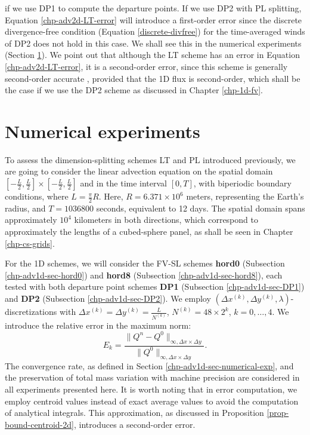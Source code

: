 if we use DP1 to compute the departure points.
If we use DP2 with PL splitting, Equation \eqref{chp-adv2d-LT-error} will introduce a first-order error since the discrete divergence-free condition (Equation \eqref{discrete-divfree})
for the time-averaged winds of DP2 does not hold in this case.
We shall see this in the numerical experiments (Section \ref{sec-ds-exp}).
We point out that although the LT scheme has an error in Equation \eqref{chp-adv2d-LT-error}, it is a second-order error,
since this scheme is generally second-order accurate \citep{holden:2010}, provided that the 1D flux is second-order, 
which shall be the case if we use the DP2 scheme as discussed in Chapter \ref{chp-1d-fv}.

\section{Numerical experiments}
\label{sec-ds-exp}
To assess the dimension-splitting schemes LT and PL introduced previously, we are going to consider the linear advection 
equation on the spatial domain $[-\frac{L}{2},\frac{L}{2}]\times[-\frac{L}{2},\frac{L}{2}]$ and in the time interval $[0,T]$, 
with biperiodic boundary conditions, where $L = \frac{\pi}{2} R$. Here, $R = 6.371 \times 10^6$ meters, 
representing the Earth's radius, and $T = 1036800$ seconds, equivalent to 12 days. 
The spatial domain spans approximately $10^4$ kilometers in both directions,
which correspond to approximately the lengths of a cubed-sphere panel,
as shall be seen in Chapter \ref{chp-cs-grids}.

For the 1D schemes, we will consider the FV-SL schemes \textbf{hord0} (Subsection \ref{chp-adv1d-sec-hord0}) and
\textbf{hord8} (Subsection \ref{chp-adv1d-sec-hord8}), 
each tested with both departure point schemes \textbf{DP1} (Subsection \ref{chp-adv1d-sec-DP1}) and \textbf{DP2} (Subsection \ref{chp-adv1d-sec-DP2}).
We employ $(\Delta x^{(k)},\Delta y^{(k)},\lambda)$-discretizations with $\Delta x^{(k)} = \Delta y^{(k)} = \frac{L}{N^{(k)}}$,
$N^{(k)} = 48 \times 2^k$, $k=0,\ldots, 4$.
We introduce the relative error in the maximum norm:
\begin{equation*}
	E_k = 
	\frac{\| Q^n - Q^0 \|_{\infty, \Delta x \times \Delta y}}
	{\|Q^0\|_{\infty, \Delta x \times \Delta y}}.
\end{equation*}
The convergence rate, as defined in Section \ref{chp-adv1d-sec-numerical-exp}, and the preservation of total mass variation with 
machine precision are considered in all experiments presented here.
It is worth noting that in error computation, we employ centroid values instead of exact average values to avoid 
the computation of analytical integrals.
This approximation, as discussed in Proposition \ref{prop-bound-centroid-2d}, introduces a second-order error.

